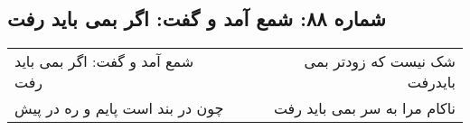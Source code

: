 \begin{center}
\section*{شماره ۸۸: شمع آمد و گفت: اگر بمی باید رفت}
\label{sec:088}
\begin{longtable}{l p{0.5cm} r}
شمع آمد و گفت: اگر بمی باید رفت
&&
شک نیست که زودتر بمی بایدرفت
\\
چون در بند است پایم و ره در پیش
&&
ناکام مرا به سر بمی باید رفت
\\
\end{longtable}
\end{center}
